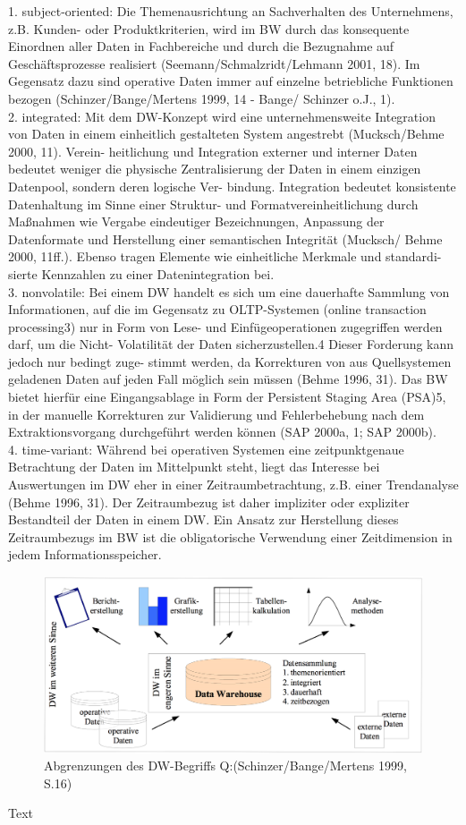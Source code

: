 1. subject-oriented: Die Themenausrichtung an Sachverhalten des Unternehmens, z.B. Kunden- oder Produktkriterien, wird im BW durch das konsequente Einordnen aller Daten in Fachbereiche und durch die Bezugnahme auf Geschäftsprozesse realisiert (Seemann/Schmalzridt/Lehmann 2001, 18). Im Gegensatz dazu sind operative Daten immer auf einzelne betriebliche Funktionen bezogen (Schinzer/Bange/Mertens 1999, 14 - Bange/ Schinzer o.J., 1). \\
2. integrated: Mit dem DW-Konzept wird eine unternehmensweite Integration von Daten in einem einheitlich gestalteten System angestrebt (Mucksch/Behme 2000, 11). Verein- heitlichung und Integration externer und interner Daten bedeutet weniger die physische Zentralisierung der Daten in einem einzigen Datenpool, sondern deren logische Ver- bindung. Integration bedeutet konsistente Datenhaltung im Sinne einer Struktur- und Formatvereinheitlichung durch Maßnahmen wie Vergabe eindeutiger Bezeichnungen, Anpassung der Datenformate und Herstellung einer semantischen Integrität (Mucksch/ Behme 2000, 11ff.). Ebenso tragen Elemente wie einheitliche Merkmale und standardi- sierte Kennzahlen zu einer Datenintegration bei.\\
3. nonvolatile: Bei einem DW handelt es sich um eine dauerhafte Sammlung von Informationen, auf die im Gegensatz zu OLTP-Systemen (online transaction processing3) nur in Form von Lese- und Einfügeoperationen zugegriffen werden darf, um die Nicht- Volatilität der Daten sicherzustellen.4 Dieser Forderung kann jedoch nur bedingt zuge- stimmt werden, da Korrekturen von aus Quellsystemen geladenen Daten auf jeden Fall möglich sein müssen (Behme 1996, 31). Das BW bietet hierfür eine Eingangsablage in Form der Persistent Staging Area (PSA)5, in der manuelle Korrekturen zur Validierung und Fehlerbehebung nach dem Extraktionsvorgang durchgeführt werden können (SAP 2000a, 1; SAP 2000b).\\
4. time-variant: Während bei operativen Systemen eine zeitpunktgenaue Betrachtung der Daten im Mittelpunkt steht, liegt das Interesse bei Auswertungen im DW eher in einer Zeitraumbetrachtung, z.B. einer Trendanalyse (Behme 1996, 31). Der Zeitraumbezug ist daher impliziter oder expliziter Bestandteil der Daten in einem DW. Ein Ansatz zur Herstellung dieses Zeitraumbezugs im BW ist die obligatorische Verwendung einer Zeitdimension in jedem Informationsspeicher.


\begin{figure}[H]
    \centering
    \includegraphics[width=1\textwidth]{files/DWOverview}
    \caption{Abgrenzungen des DW-Begriffs Q:(Schinzer/Bange/Mertens 1999, S.16)}
    \label{pic:DWOverview}
\end{figure}




Text
